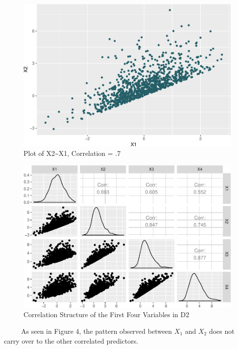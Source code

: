 \documentclass[12pt,twoside]{reedthesis}
\begin{document}
  \begin{figure}[htbp]
  \centering
  \includegraphics{Thesis_files/figure-latex/x2x2-1.pdf}
  \caption{\label{fig:x2x2}Plot of X2\textasciitilde{}X1, Correlation = .7}
  \end{figure}
  
  \begin{figure}[htbp]
  \centering
  \includegraphics{Thesis_files/figure-latex/compsD2-1.pdf}
  \caption{\label{fig:compsD2}Correlation Structure of the First Four
  Variables in D2}
  \end{figure}
  
  ~~~~~As seen in Figure 4, the pattern observed between \(X_1\) and
  \(X_2\) does not carry over to the other correlated predictors.
  
\end{document}
